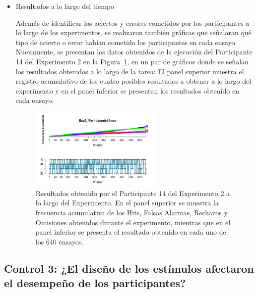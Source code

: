 \begin{itemize}
\item Resultados a lo largo del tiempo

Además de identificar los aciertos y errores cometidos por los participantes a lo largo de los experimentos, se realizaron también gráficas que señalaran qué tipo de acierto o error habían cometido los participantes en cada ensayo. Nuevamente, se presentan los datos obtenidos de la ejecución del Participante 14 del Experimento 2 en la Figura~\ref{fig:Outcome_E2_P14}, en un par de gráficos donde se señalan los resultados obtenidos a lo largo de la tarea: El panel superior muestra el registro acumulativo de los cuatro posibles resultados a obtener a lo largo del experimento y en el panel inferior se presentan los resultados obtenido en cada ensayo.\\ 

\begin{figure}[th]
\centering
\includegraphics[width=0.60\textwidth]{Figures/Outcome_Exp2_P14}
\caption[Resultado obtenido a lo largo del tiempo: Ejemplo]{Resultados obtenido por el Participante 14 del Experimento 2 a lo largo del Experimento. En el panel superior se muestra la frecuencia acumulativa de los  Hits, Falsas Alarmas, Rechazos y Omisiones obtenidos durante el experimento, mientras que en el panel inferior se presenta el resultado obtenido en cada uno de los 640 ensayos.}
\label{fig:Outcome_E2_P14}
\end{figure}


\end{itemize}











\subsection{Control 3: ¿El diseño de los estímulos afectaron el desempeño de los participantes?}

